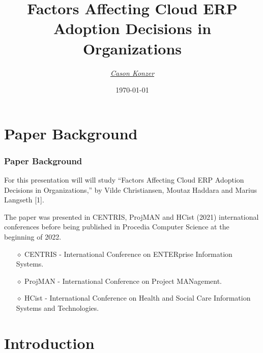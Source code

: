 \documentclass{beamer}
\title[Factors Affecting Cloud ERP Adoption Decisions in Organizations]{Factors Affecting Cloud ERP Adoption Decisions in Organizations}
\author{\XV\textit{\large{\href{https://github.com/casonk}{Cason Konzer}}}\XB}
\institute[UM FLINT]{\normalsize{\textit{casonk@umich.edu}}}
\date[]{\today}
\begin{document}
\begin{frame}
    \titlepage
\end{frame}




\section{Paper Background}

\begin{frame}

    \frametitle{Paper Background}

    For this presentation will will study ``Factors Affecting Cloud ERP Adoption Decisions in Organizations,'' by Vilde Christiansen, Moutaz Haddara and Marius Langseth [1]. \pause

    \vspace{5mm}
    The paper was presented in CENTRIS, ProjMAN and HCist (2021) international conferences before being published in Procedia Computer Science at the beginning of 2022. \pause
    
    \vspace{2.5mm}
    \begin{itemize}
        \item[$\diamond$] CENTRIS - International Conference on ENTERprise Information Systems. \pause
        \item[$\diamond$] ProjMAN - International Conference on Project MANagement. \pause
        \item[$\diamond$] HCist - International Conference on Health and Social Care Information Systems and Technologies.
    \end{itemize}

\end{frame}


\section{Introduction}
\end{document}
